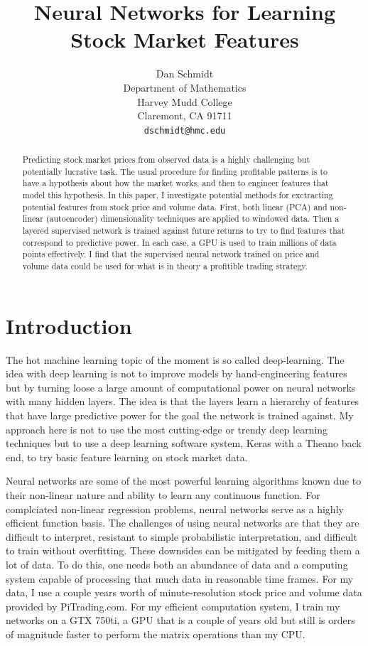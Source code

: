 \documentclass{article}
\title{Neural Networks for Learning Stock Market Features}
\author{
  Dan Schmidt \\
  Department of Mathematics\\
  Harvey Mudd College\\
  Claremont, CA 91711 \\
  \texttt{dschmidt@hmc.edu} \\
}
\begin{document}
\maketitle

\begin{abstract}
    Predicting stock market prices from observed data is a highly challenging
    but potentially lucrative task. The usual procedure for finding
    profitable patterns is to have a hypothesis about how the market works,
    and then to engineer features that model this hypothesis. In this paper,
    I investigate potential methods for exctracting potential features from
    stock price and volume data. First, both linear (PCA) and non-linear
    (autoencoder) dimensionality techniques are applied to windowed data.
    Then a layered supervised network is trained against future returns 
    to try to find features that correspond to predictive power. In each
    case, a GPU is used to train millions of data points effectively. I
    find that the supervised neural network trained on price and volume
    data could be used for what is in theory a profitible trading strategy. 
\end{abstract}

\section{Introduction}

The hot machine learning topic of the moment is so called deep-learning. The
idea with deep learning is not to improve models by hand-engineering features
but by turning loose a large amount of computational power on neural networks
with many hidden layers. The idea is that the layers learn a hierarchy of 
features that have large predictive power for the goal the network is trained
against. My approach here is not to use the most cutting-edge or trendy
deep learning techniques but to use a deep learning software system, Keras 
with a Theano back end, to try basic feature learning on stock market data. 

Neural networks are some of the most powerful learning algorithms known due
to their non-linear nature and ability to learn any continuous function.
For complciated non-linear regression problems, neural networks serve
as a highly efficient function basis.
The challenges of using neural networks are that they are difficult to
interpret, resistant to simple probabilistic interpretation, and difficult
to train without overfitting. These downsides can be mitigated by feeding
them a lot of data. To do this, one needs both an abundance of data and
a computing system capable of processing that much data in reasonable time
frames. For my data, I use a couple years worth of minute-resolution stock
price and volume data provided by PiTrading.com. For my efficient computation
system, I train my networks on a GTX 750ti, a GPU that is a couple of years old
but still is orders of magnitude faster to perform the matrix operations than 
my CPU.
\end{document}
